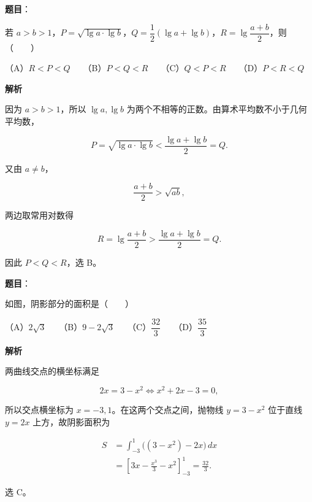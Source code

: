 \begin{answer}

\textbf{题目}：

若 $a>b>1$，$P=\sqrt{\lg a\cdot\lg b}$，$Q=\dfrac12(\lg a+\lg b)$，$R=\lg\dfrac{a+b}{2}$，则\mbox{（　　）}

（A）$R<P<Q$　　（B）$P<Q<R$　　（C）$Q<P<R$　　（D）$P<R<Q$

\textbf{解析}

因为 $a>b>1$，所以 $\lg a,\lg b$ 为两个不相等的正数。由算术平均数不小于几何平均数，

\nopagebreak[4]
\[
P=\sqrt{\lg a\cdot\lg b}
<\frac{\lg a+\lg b}{2}=Q.
\]

又由 $a\ne b$，

\nopagebreak[4]
\[
\frac{a+b}{2}>\sqrt{ab},
\]

两边取常用对数得

\nopagebreak[4]
\[
R=\lg\frac{a+b}{2}
>\frac{\lg a+\lg b}{2}=Q.
\]

因此 $P<Q<R$，选 B。


\end{answer}
\begin{answer}

\textbf{题目}：

如图，阴影部分的面积是\mbox{（　　）}
\nopagebreak[4]
\begin{center}\end{center}
\nopagebreak[4]
（A）$2\sqrt3$　　（B）$9-2\sqrt3$　　（C）$\dfrac{32}{3}$　　（D）$\dfrac{35}{3}$

\textbf{解析}

两曲线交点的横坐标满足

\nopagebreak[4]
\[
2x=3-x^2
\Longleftrightarrow
x^2+2x-3=0,
\]

所以交点横坐标为 $x=-3,1$。在这两个交点之间，抛物线 $y=3-x^2$ 位于直线 $y=2x$ 上方，故阴影面积为

\nopagebreak[4]
\[
\begin{aligned}
S&=\int_{-3}^{1}\bigl((3-x^2)-2x\bigr)\,dx\\
&=\left[3x-\frac{x^3}{3}-x^2\right]_{-3}^{1}
=\frac{32}{3}.
\end{aligned}
\]

选 C。


\end{answer}
